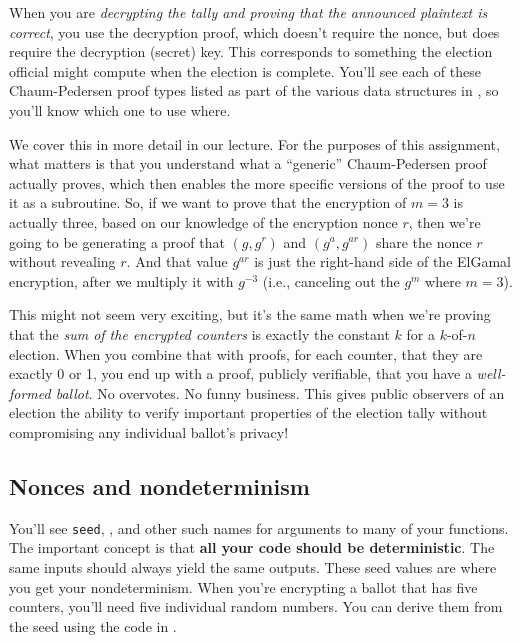 When you are {\em decrypting the tally and proving that the announced
  plaintext is correct}, you use the decryption proof, which doesn't
require the nonce, but does require the decryption (secret) key. This
corresponds to something the election official might compute when the
election is complete. You'll see each of these Chaum-Pedersen proof
types listed as part of the various data structures in
,
so you'll know which one to use where.

We cover this in more detail in our lecture. For the purposes of this assignment,
what matters is that you understand what a ``generic'' Chaum-Pedersen
proof actually proves, which then enables the more specific versions of the proof
to use it as a subroutine. So, if we want to prove that the encryption
of $m=3$ is actually three, based on our knowledge of the encryption
nonce $r$, then we're going to be generating a proof that $(g, g^r)$
and $(g^a, g^{ar})$ share the nonce $r$ without revealing $r$. And that
value $g^{ar}$ is just the right-hand side of the ElGamal
encryption, after we multiply it with $g^{-3}$ (i.e., canceling
out the $g^m$ where $m=3$).

This might not seem very exciting, but it's the same math when we're
proving that the {\em sum of the encrypted counters} is exactly the
constant $k$ for a $k$-of-$n$ election. When you combine that with
proofs, for each counter, that they are exactly 0 or 1, you end up
with a proof, publicly verifiable, that you have a {\em well-formed
  ballot}. No overvotes. No funny business. This gives public
observers of an election the ability to verify important properties of
the election tally without compromising any individual ballot's privacy!


\subsection{Nonces and nondeterminism}
\label{sec:nonces}
You'll see {\tt seed}, , and other
such names for arguments to many of your functions. The important
concept is that {\bf all your code should be deterministic}. The same
inputs should always yield the same outputs. These seed values are
where you get your nondeterminism. When you're encrypting a ballot
that has five counters, you'll need five individual random numbers.
You can derive them from the seed using the code in . 

